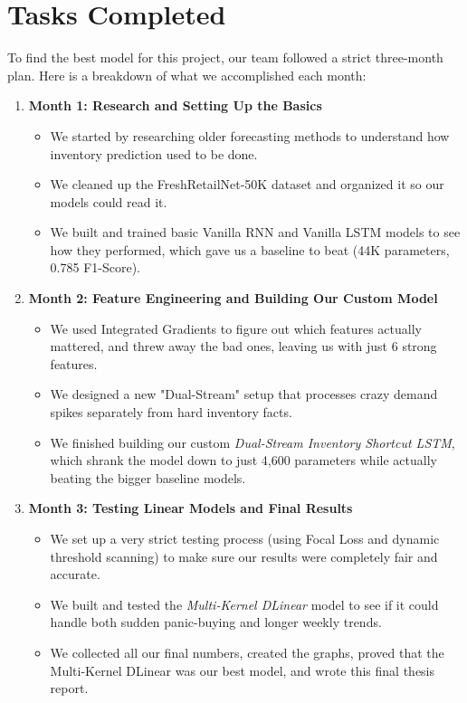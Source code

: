 \chapter{Tasks Completed}
\label{chap:tasks}

To find the best model for this project, our team followed a strict three-month plan. Here is a breakdown of what we accomplished each month:

\begin{enumerate}
    \item \textbf{Month 1: Research and Setting Up the Basics} 
    
    \begin{itemize}
        \item We started by researching older forecasting methods to understand how inventory prediction used to be done.
        \item We cleaned up the FreshRetailNet-50K dataset and organized it so our models could read it.
        \item We built and trained basic Vanilla RNN and Vanilla LSTM models to see how they performed, which gave us a baseline to beat (44K parameters, 0.785 F1-Score).
    \end{itemize}
    
    \item \textbf{Month 2: Feature Engineering and Building Our Custom Model}
    
    \begin{itemize}
        \item We used Integrated Gradients to figure out which features actually mattered, and threw away the bad ones, leaving us with just 6 strong features.
        \item We designed a new "Dual-Stream" setup that processes crazy demand spikes separately from hard inventory facts.
        \item We finished building our custom \textit{Dual-Stream Inventory Shortcut LSTM}, which shrank the model down to just 4,600 parameters while actually beating the bigger baseline models.
    \end{itemize}
    
    \item \textbf{Month 3: Testing Linear Models and Final Results}
    
    \begin{itemize}
        \item We set up a very strict testing process (using Focal Loss and dynamic threshold scanning) to make sure our results were completely fair and accurate.
        \item We built and tested the \textit{Multi-Kernel DLinear} model to see if it could handle both sudden panic-buying and longer weekly trends.
        \item We collected all our final numbers, created the graphs, proved that the Multi-Kernel DLinear was our best model, and wrote this final thesis report.
    \end{itemize}
\end{enumerate}
